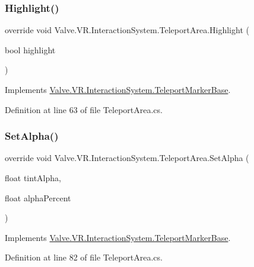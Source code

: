 \subsubsection{\texorpdfstring{Highlight()}{Highlight()}}
{\footnotesize\ttfamily override void Valve.\+V\+R.\+Interaction\+System.\+Teleport\+Area.\+Highlight (\begin{DoxyParamCaption}\item[{bool}]{highlight }\end{DoxyParamCaption})\hspace{0.3cm}{\ttfamily [virtual]}}



Implements \mbox{\hyperlink{class_valve_1_1_v_r_1_1_interaction_system_1_1_teleport_marker_base_ab2505033275992613453b17981dd4053}{Valve.\+V\+R.\+Interaction\+System.\+Teleport\+Marker\+Base}}.



Definition at line 63 of file Teleport\+Area.\+cs.

\mbox{\label{class_valve_1_1_v_r_1_1_interaction_system_1_1_teleport_area_ae510f0958167635ad57ebab1a16bdd38}} 
\subsubsection{\texorpdfstring{SetAlpha()}{SetAlpha()}}
{\footnotesize\ttfamily override void Valve.\+V\+R.\+Interaction\+System.\+Teleport\+Area.\+Set\+Alpha (\begin{DoxyParamCaption}\item[{float}]{tint\+Alpha,  }\item[{float}]{alpha\+Percent }\end{DoxyParamCaption})\hspace{0.3cm}{\ttfamily [virtual]}}



Implements \mbox{\hyperlink{class_valve_1_1_v_r_1_1_interaction_system_1_1_teleport_marker_base_a0f8f7a7f338cea092cbe1e9e1c12d4f2}{Valve.\+V\+R.\+Interaction\+System.\+Teleport\+Marker\+Base}}.



Definition at line 82 of file Teleport\+Area.\+cs.

\mbox{\label{class_valve_1_1_v_r_1_1_interaction_system_1_1_teleport_area_ad9af038ae8e61a6494ce9dc42f902395}} 
